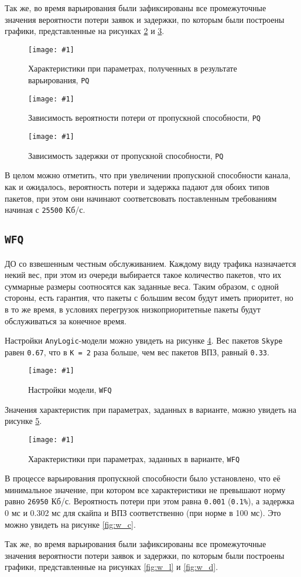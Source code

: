 \documentclass[12pt, a4paper]{article}
\newcommand{\figc}[4]{
  \begin{figure}[H]
  \begin{center}
    \texttt{[image: \#1]}
    \caption{#2}
    \label{fig:#3}
  \end{center}
  \end{figure}
}
\begin{document}
Так же, во время варьирования были зафиксированы
все промежуточные значения вероятности потери заявок и задержки, по которым
были построены графики, представленные на рисунках \ref{fig:p_l} и \ref{fig:p_d}.

\figc{op/C25_5E10OP}{Характеристики при параметрах, полученных в результате варьирования, \texttt{PQ}}{p_c}{1.0}
\figc{charts/op_loss}{Зависимость вероятности потери от пропускной способности, \texttt{PQ}}{p_l}{0.8}
\figc{charts/op_delay}{Зависимость задержки от пропускной способности, \texttt{PQ}}{p_d}{0.8}

В целом можно отметить, что при увеличении пропускной способности канала, как
и ожидалось, вероятность потери и задержка падают для обоих типов пакетов,
при этом они начинают соответсвовать поставленным требованиям начиная с \texttt{25500} Кб/с.

\subsection{\texttt{WFQ}}

ДО со взвешенным честным обслуживанием. Каждому виду трафика назначается некий вес,
при этом из очереди выбирается такое количество пакетов, что их суммарные размеры
соотносятся как заданные веса. Таким образом, с одной стороны, есть гарантия, что
пакеты с большим весом будут иметь приоритет, но в то же время, в условиях перегрузок
низкоприоритетные пакеты будут обслуживаться за конечное время.

Настройки \texttt{AnyLogic}-модели можно увидеть
на рисунке \ref{fig:w_set}. Вес пакетов \texttt{Skype} равен \texttt{0.67}, что в
\texttt{K = 2} раза больше, чем вес пакетов ВПЗ, равный \texttt{0.33}.

\figc{wfq/settings}{Настройки модели, \texttt{WFQ}}{w_set}{1.0}

Значения характеристик при параметрах, заданных в варианте, можно увидеть
на рисунке \ref{fig:w_v}.

\figc{wfq/C4E10WFQ}{Характеристики при параметрах, заданных в варианте, \texttt{WFQ}}{w_v}{1.0}

В процессе варьирования пропускной способности было установлено, что
её минимальное значение, при котором все характеристики не превышают
норму равно \texttt{26950} Кб/с. Вероятность потери при этом равна
\texttt{0.001} (\texttt{0.1\%}), а задержка 0 мс и 0.302 мс
для скайпа и ВПЗ соответственно (при норме в 100 мс).
Это можно увидеть на рисунке \ref{fig:w_c}.

Так же, во время варьирования были зафиксированы
все промежуточные значения вероятности потери заявок и задержки, по которым
были построены графики, представленные на рисунках \ref{fig:w_l} и \ref{fig:w_d}.
\end{document}
